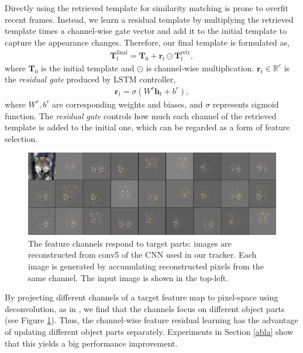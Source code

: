 \documentclass[runningheads]{llncs}
\begin{document}
Directly using the retrieved template for similarity matching  is prone to overfit recent frames.
Instead, we learn a residual template by multiplying the retrieved template times a channel-wise gate vector and add it to the initial template to capture the appearance changes. Therefore, our final template is formulated as,
\begin{align}
\mathbf{T}^{\text{final}}_t = \mathbf{T}_0+ \mathbf{r}_t\odot \mathbf{T}^{\text{retr}}_t,
\end{align}
where $\mathbf{T}_0$ is the initial template and  $\odot$ is channel-wise multiplication.
%
$\mathbf{r}_t\in \mathbb{R}^c$ is the \textit{residual gate} produced by LSTM controller, 
\begin{align}
\mathbf{r}_t = \sigma (W^r\mathbf{h}_{t}+b^r),
\end{align}
where $W^r, b^r$ are corresponding weights and biases, and $\sigma$ represents sigmoid function. 
The \textit{residual gate} controls how much each channel of the retrieved template is added to the initial one, which can be regarded as a form of feature selection. 

\begin{figure}[t]
	\begin{center}
		\includegraphics[width=0.65\linewidth]{channel2.jpg}
	\end{center}
	\vspace{-4mm}
	\caption{The feature channels respond to target parts: images are reconstructed from conv5 of the CNN used in our tracker. Each image is generated by accumulating reconstructed pixels from the same channel. The input image is shown in the top-left. }
	\vspace{-2mm}
	\label{fig:6}
\end{figure}

By projecting different channels of a target feature map to pixel-space using deconvolution, as in \cite{Zeiler2014}, we find that the channels focus on different object parts (see Figure \ref{fig:6}). %
Thus, the channel-wise feature residual learning has the advantage of updating different object parts separately. Experiments in Section \ref{abla} show that this yields a big performance improvement. 
\end{document}
